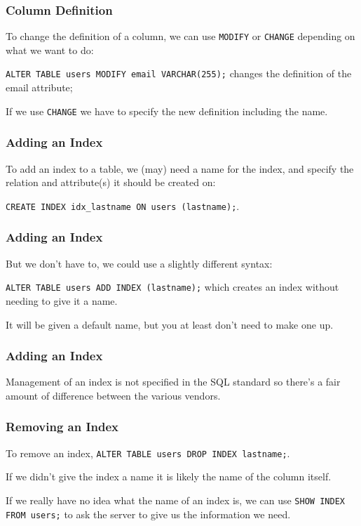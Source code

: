 \begin{frame}
\frametitle{Column Definition}

To change the definition of a column, we can use \texttt{MODIFY} or \texttt{CHANGE} depending on what we want to do: 

\texttt{ALTER TABLE users MODIFY email VARCHAR(255);} changes the definition of the email attribute; 

If we use \texttt{CHANGE} we have to specify the new definition including the name.

\end{frame}

\begin{frame}
\frametitle{Adding an Index}

To add an index to a table, we (may) need a name for the index, and specify the relation and attribute(s) it should be created on: 

\texttt{CREATE INDEX idx\_lastname ON users (lastname);}. 


\end{frame}

\begin{frame}
\frametitle{Adding an Index}


But we don't have to, we could use a slightly different syntax: 

\texttt{ALTER TABLE users ADD INDEX (lastname);} which creates an index without needing to give it a name. 

It will be given a default name, but you at least don't need to make one up. 

\end{frame}

\begin{frame}
\frametitle{Adding an Index}


Management of an index is not specified in the SQL standard so there's a fair amount of difference between the various vendors.


\end{frame}

\begin{frame}
\frametitle{Removing an Index}

To remove an index, \texttt{ALTER TABLE users DROP INDEX lastname;}. 

If we didn't give the index a name it is likely the name of the column itself. 

If we really have no idea what the name of an index is, we can use \texttt{SHOW INDEX FROM users;} to ask the server to give us the information we need.


\end{frame}

